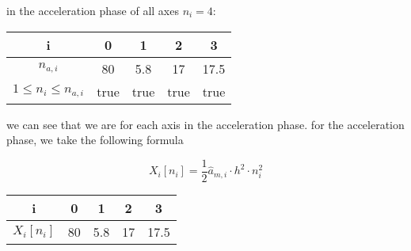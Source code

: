 \documentclass[%
  professionalfonts,%
  xcolor={%
    usenames,%
    dvipsnames,%
    svgnames,%
    table,%
    hyperref%
  }%
]{beamer}
\begin{document}
\begin{frame}
in the acceleration phase of all axes $n_i = 4$:

\begin{center}
\begin{tabular}{ccccc}
\toprule
i & 0 & 1 & 2 & 3 \\
\midrule
$n_{a,i}$ & 80 & 5.8 & 17 & 17.5 \\ 
$1 \leq n_{i} \leq n_{a,i}$ & true & true & true & true \\
\bottomrule
\end{tabular}
\end{center}

we can see that we are for each axis in the acceleration phase. for the acceleration phase, we take the following formula

\begin{equation*}
X_{i}[n_{i}] = \frac{1}{2} \hat{a}_{m,i} \cdot h^2 \cdot n_{i}^2
\end{equation*}

\begin{center}
\begin{tabular}{ccccc}
\toprule
i & 0 & 1 & 2 & 3 \\
\midrule
$X_{i}[n_{i}]$ & 80 & 5.8 & 17 & 17.5 \\
\bottomrule
\end{tabular}
\end{center}
\end{frame}
\end{document}
